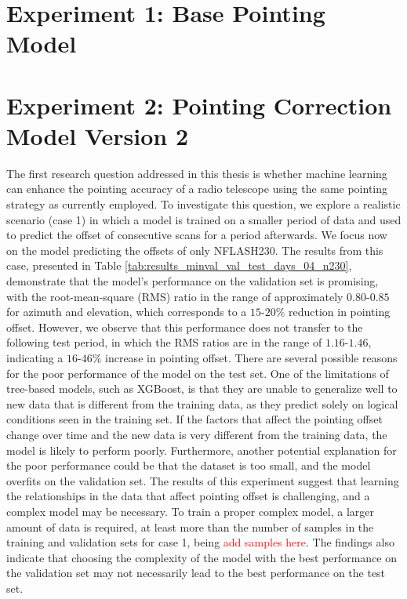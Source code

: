 \section{Experiment 1: Base Pointing Model}
 

\section{Experiment 2: Pointing Correction Model Version 2}
The first research question addressed in this thesis is whether machine learning can enhance the pointing accuracy of a radio telescope using the same pointing strategy as currently employed.
To investigate this question, we explore a realistic scenario (case 1) in which a model is trained on a smaller period of data and used to predict the offset of consecutive scans for a period afterwards.
We focus now on the model predicting the offsets of only NFLASH230. 
The results from this case, presented in Table \ref{tab:results_minval_val_test_days_04_n230}, demonstrate that the model's performance on the validation set is promising,
with the root-mean-square (RMS) ratio in the range of approximately $0.80$-$0.85$ for azimuth and elevation,
which corresponds to a $15$-$20\%$ reduction in pointing offset.
However, we observe that this performance does not transfer to the following test period,
in which the RMS ratios are in the range of $1.16$-$1.46$, indicating a $16$-$46\%$ increase in pointing offset.
There are several possible reasons for the poor performance of the model on the test set.
One of the limitations of tree-based models, such as XGBoost, is that they are unable to generalize well to new data that is different from the training data,
as they predict solely on logical conditions seen in the training set.
If the factors that affect the pointing offset change over time and the new data is very different from the training data, the model is likely to perform poorly. 
Furthermore, another potential explanation for the poor performance could be that the dataset is too small, and the model overfits on the validation set.
The results of this experiment suggest that learning the relationships in the data that affect pointing offset is challenging, and a complex model may be necessary.
To train a proper complex model, a larger amount of data is required, at least more than the number of samples in the training and validation sets for case 1, being \textcolor{red}{add samples here}.
The findings also indicate that choosing the complexity of the model with the best performance on the validation set may not necessarily lead to the best performance on the test set.
